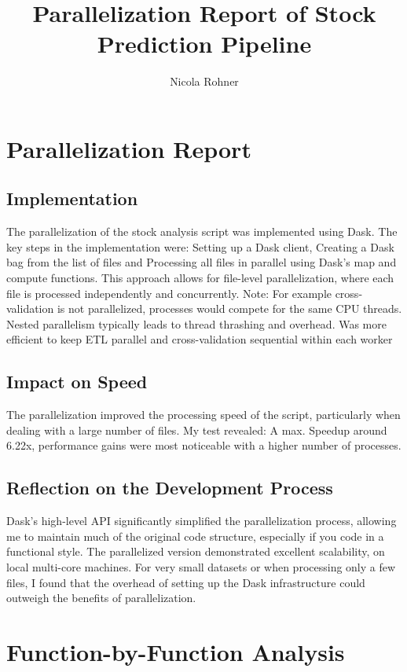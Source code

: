 \documentclass[11pt,a4paper]{article}
\title{Parallelization Report of Stock Prediction Pipeline}
\author{Nicola Rohner}
\begin{document}
\maketitle

\section{Parallelization Report}

\subsection{Implementation}
The parallelization of the stock analysis script was implemented using Dask. The key steps in the implementation were:
Setting up a Dask client, Creating a Dask bag from the list of files and Processing all files in parallel using Dask's map and compute functions.
This approach allows for file-level parallelization, where each file is processed independently and concurrently.
Note:
For example cross-validation is not parallelized, processes would compete for the same CPU threads. Nested parallelism typically leads to thread thrashing and overhead. Was more efficient to keep ETL parallel and cross-validation sequential within each worker

\subsection{Impact on Speed}
The parallelization improved the processing speed of the script, particularly when dealing with a large number of files. My test revealed:
A max. Speedup around 6.22x, performance gains were most noticeable with a higher number of processes.

\subsection{Reflection on the Development Process}
Dask's high-level API significantly simplified the parallelization process, allowing me to maintain much of the original code structure, especially if you code in a functional style.
The parallelized version demonstrated excellent scalability, on local multi-core machines.
For very small datasets or when processing only a few files, I found that the overhead of setting up the Dask infrastructure could outweigh the benefits of parallelization. 


\section{Function-by-Function Analysis}
\end{document}
